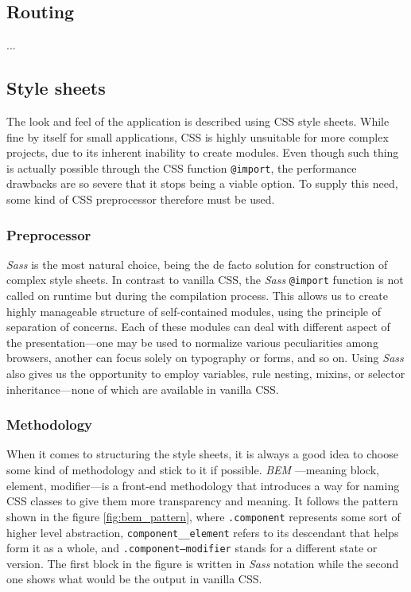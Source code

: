 \documentclass[thesis=M,english,hidelinks]{FITthesis}[2012/10/20]
\newcommand{\code}{\texttt}
\begin{document}
  \subsection{Routing}

  ...

  \subsection{Style sheets}

The look and feel of the application is described using CSS style sheets. While fine by itself for small applications, CSS is highly unsuitable for more complex projects, due to its inherent inability to create modules. Even though such thing is actually possible through the CSS function \code{@import}, the performance drawbacks are so severe that it stops being a viable option. To supply this need, some kind of CSS preprocessor therefore must be used.

    \subsubsection{Preprocessor}

\textit{Sass} \cite{sass} is the most natural choice, being the de facto solution for construction of complex style sheets. In contrast to vanilla CSS, the \textit{Sass} \code{@import} function is not called on runtime but during the compilation process. This allows us to create highly manageable structure of self-contained modules, using the principle of separation of concerns. Each of these modules can deal with different aspect of the presentation---one may be used to normalize various peculiarities among browsers, another can focus solely on typography or forms, and so on. Using \textit{Sass} also gives us the opportunity to employ variables, rule nesting, mixins, or selector inheritance---none of which are available in vanilla CSS.

    \subsubsection{Methodology}

When it comes to structuring the style sheets, it is always a good idea to choose some kind of methodology and stick to it if possible. \textit{BEM} \cite{bem}---meaning block, element, modifier---is a front-end methodology that introduces a way for naming CSS classes to give them more transparency and meaning. It follows the pattern shown in the figure \ref{fig:bem_pattern}, where \code{.component} represents some sort of higher level abstraction, \code{component\_\_element} refers to its descendant that helps form it as a whole, and \code{.component--modifier} stands for a different state or version. The first block in the figure is written in \textit{Sass} notation while the second one shows what would be the output in vanilla CSS.
\end{document}
